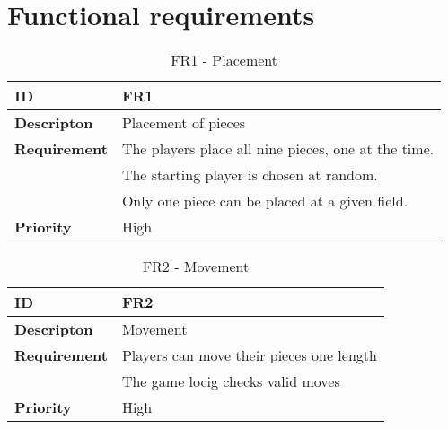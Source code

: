 \newpage
\clearpage

\section{Functional requirements}


\begin{table}[h!]
\begin{tabular}{ | p{90pt} | p{270pt}  |}
\hline
\bf ID &  FR1  \\ \hline
\bf Descripton & Placement of pieces \\ \hline 
\bf Requirement & The players place all nine pieces, one at the time.  \\   
& The starting player is chosen at random. \\ 
& Only one piece can be placed at a given field. \\ \hline
\bf Priority & High \\ \hline
\end{tabular}

\caption{FR1 - Placement}

\end{table}


\begin{table}[h!]
\begin{tabular}{ | p{90pt} | p{270pt}  |}
\hline
\bf ID &  FR2  \\ \hline
\bf Descripton & Movement \\ \hline 
\bf Requirement & Players can move their pieces one length  \\
& The game locig checks valid moves  \\ \hline
\bf Priority & High \\ \hline

\end{tabular}

\caption{FR2 - Movement}

\end{table}


